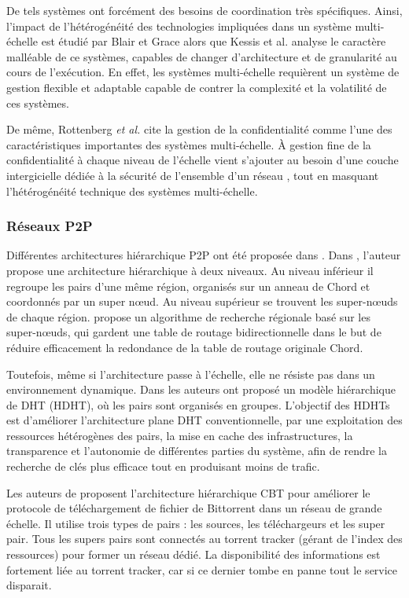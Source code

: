 De tels systèmes ont forcément des besoins de coordination très spécifiques. Ainsi, l'impact de l'hétérogénéité des technologies impliquées dans un système multi-échelle est étudié par Blair et Grace \cite{Blair12} alors que Kessis et al. \cite{Kessis09} analyse le caractère malléable de ce systèmes, capables de changer d'architecture et de granularité au cours de l'exécution. En effet, les systèmes multi-échelle requièrent un système de gestion flexible et adaptable capable de contrer la complexité et la volatilité de ces systèmes.

De même, Rottenberg \textit{et al.} \cite{Rottenberg2012} cite la gestion de la confidentialité comme l'une des caractéristiques importantes des systèmes multi-échelle. À gestion fine de la confidentialité à chaque niveau de l'échelle vient s'ajouter au besoin d'une couche intergicielle dédiée à la sécurité de l'ensemble d'un réseau \cite{Steffenel12a}, tout en masquant l'hétérogénéité technique des systèmes multi-échelle.

\subsubsection*{Réseaux P2P}

Différentes architectures hiérarchique P2P ont été proposée dans \cite{Peng07,Ji10,Erice04,Ratnasamy01}. Dans \cite{Ji10}, l'auteur propose une architecture hiérarchique à deux niveaux. Au niveau inférieur il regroupe les pairs d'une même région, organisés sur un anneau de Chord et coordonnés par un super n{\oe}ud. Au niveau supérieur se trouvent les super-n{\oe}uds de chaque région. \cite{Ji10} propose un algorithme de recherche régionale basé sur les super-n{\oe}uds, qui gardent une table de routage bidirectionnelle dans le but de réduire efficacement la redondance de la table de routage originale Chord. 

Toutefois, même si l'architecture passe à l'échelle, elle ne résiste pas dans un environnement dynamique. Dans \cite{Erice04} les auteurs ont proposé un modèle hiérarchique de DHT (HDHT), où les pairs sont organisés en groupes. L'objectif des HDHTs est d'améliorer l'architecture plane DHT conventionnelle, par une exploitation des ressources hétérogènes des pairs, la mise en cache des infrastructures, la transparence et l'autonomie de différentes parties du système, afin de rendre la recherche de clés plus efficace tout en produisant moins de trafic. 

Les auteurs de \cite{Ratnasamy01} proposent l'architecture hiérarchique CBT pour améliorer le protocole de téléchargement de fichier de Bittorrent dans un réseau de grande échelle. Il utilise trois types de pairs : les sources, les téléchargeurs et les super pair. Tous les supers pairs sont connectés au torrent tracker (gérant de l'index des ressources) pour former un réseau dédié. La disponibilité des informations est fortement liée au torrent tracker, car si ce dernier tombe en panne tout le service disparait. 


